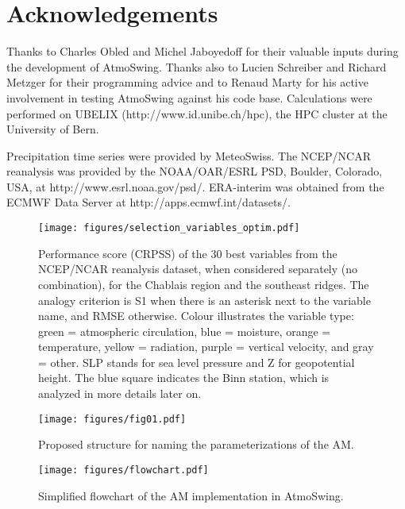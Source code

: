 \documentclass[review]{elsarticle}
\begin{document}
\section*{Acknowledgements}
Thanks to Charles Obled and Michel Jaboyedoff for their valuable inputs during the development of AtmoSwing. Thanks also to Lucien Schreiber and Richard Metzger for their programming advice and to Renaud Marty for his active involvement in testing AtmoSwing against his code base. Calculations were performed on UBELIX (http://www.id.unibe.ch/hpc), the HPC cluster at the University of Bern. 

Precipitation time series were provided by MeteoSwiss. The NCEP/NCAR reanalysis was provided by the NOAA/OAR/ESRL PSD, Boulder, Colorado, USA, at http://www.esrl.noaa.gov/psd/. ERA-interim was obtained from the ECMWF Data Server at http://apps.ecmwf.int/datasets/. 





\clearpage


\begin{figure*}[t]
	\texttt{[image: figures/selection\_variables\_optim.pdf]}
	\caption{Performance score (CRPSS) of the 30 best variables from the NCEP/NCAR reanalysis dataset, when considered separately (no combination), for the Chablais region and the southeast ridges. The analogy criterion is S1 when there is an asterisk next to the variable name, and RMSE otherwise. Colour illustrates the variable type: green = atmospheric circulation, blue = moisture, orange = temperature, yellow = radiation, purple = vertical velocity, and gray = other. SLP stands for sea level pressure and Z for geopotential height. The blue square indicates the Binn station, which is analyzed in more details later on.} 
	\label{figure:variable_exploration}
\end{figure*}

\begin{figure}[t]
	\texttt{[image: figures/fig01.pdf]}
	\caption{Proposed structure for naming the parameterizations of the AM.}
	\label{figure:nomenclature}
\end{figure}

\begin{figure}[t]
	\texttt{[image: figures/flowchart.pdf]}
	\caption{Simplified flowchart of the AM implementation in AtmoSwing.}
	\label{figure:flowchart_modules_atmoswing}
\end{figure}
\end{document}
